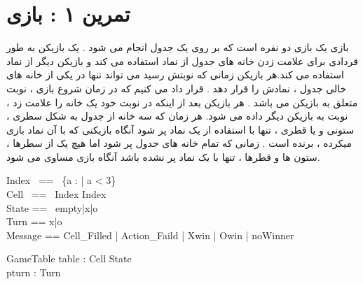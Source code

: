 \documentclass{article}
\title{\lr{Formal Specification and Verification of Programs}}
\author{\lr{2nd Assignment Solutions}\\
\lr{Mohammad Hossein Khoshechin - 99210164}\\
\lr{Group 2}}
\begin{document}
\maketitle

\section*{تمرین ۱ : بازی }
بازی  یک بازی دو نفره است که بر روی یک جدول انجام می شود . یک بازیکن به طور قردادی برای علامت زدن خانه های جدول از نماد  استفاده می کند و بازیکن دیگر از نماد  استفاده می کند.هر بازیکن زمانی که نوبتش رسید می تواند تنها در یکی از خانه های خالی جدول ، نمادش را قرار دهد . قرار داد می کنیم که در زمان شروع بازی ،  نوبت متعلق به بازیکن  می باشد . هر بازیکن بعد از اینکه در نوبت خود یک خانه را علامت زد ، نوبت به بازیکن دیگر داده می شود. هر زمان که سه خانه از جدول به شکل سطری ،  ستونی و یا قطری ، تنها با استفاده از یک نماد پر شود آنگاه بازیکنی که با آن نماد بازی میکرده ،  برنده است . زمانی که تمام خانه های جدول پر شود اما هیچ یک از سطرها ،  ستون ها و قطرها ،  تنها با یک نماد پر نشده باشد آنگاه بازی مساوی می شود.
\\
\begin{zed}
Index~ == ~\{a : \nat | a < 3\}~\\
Cell~ == ~Index \cross Index\\
State == ~empty|x|o\\
Turn == x|o\\
Message == Cell\_Filled | Action\_Faild | Xwin | Owin | noWinner
\end{zed}

\begin{schema}{GameTable}
table : Cell \fun State\\
pturn : Turn
\end{schema}
\end{document}
